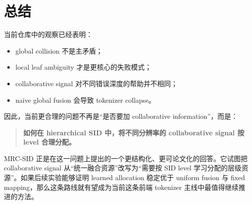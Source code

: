 \documentclass[11pt]{article}
\begin{document}
\section{总结}

当前仓库中的观察已经表明：
\begin{itemize}
  \item global collision 不是主矛盾；
  \item local leaf ambiguity 才是更核心的失败模式；
  \item collaborative signal 对不同错误深度的帮助并不相同；
  \item naive global fusion 会导致 tokenizer collapse。
\end{itemize}

因此，当前更合理的问题不再是“是否要加 collaborative information”，而是：
\begin{quote}
\textbf{如何在 hierarchical SID 中，将不同分辨率的 collaborative signal 按 level 合理分配。}
\end{quote}

MRC-SID 正是在这一问题上提出的一个更结构化、更可论文化的回答。它试图把 collaborative signal 从“统一融合资源”改写为“需要按 SID level 学习分配的层级资源”。如果后续实验能够证明 learned allocation 稳定优于 uniform fusion 与 fixed mapping，那么这条路线就有望成为当前这条前端 tokenizer 主线中最值得继续推进的方法。
\end{document}
